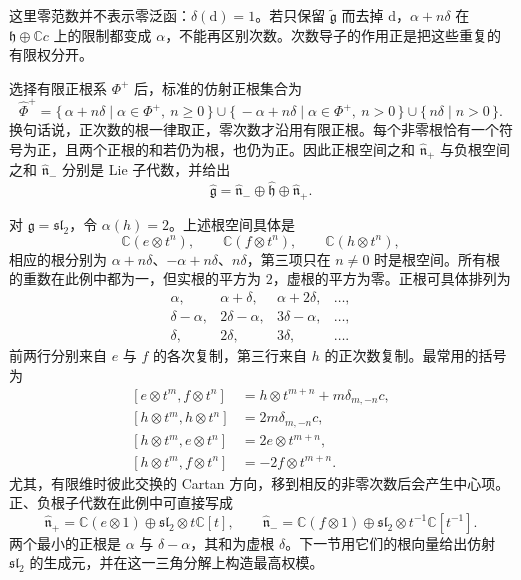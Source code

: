 这里零范数并不表示零泛函：\(\delta(\mathrm d)=1\)。若只保留 \(\widetilde{\mathfrak g}\) 而去掉 \(\mathrm d\)，\(\alpha+n\delta\) 在 \(\mathfrak h\oplus\mathbb Cc\) 上的限制都变成 \(\alpha\)，不能再区别次数。次数导子的作用正是把这些重复的有限权分开。

\ProseParagraphBreak

选择有限正根系 \(\Phi^+\) 后，标准的仿射正根集合为
\begin{equation}\label{b5:eq:G-affine-positive-roots}
	\widehat\Phi^+
	=\{\,\alpha+n\delta\mid\alpha\in\Phi^+,\ n\ge0\,\}
	\cup\{\,-\alpha+n\delta\mid\alpha\in\Phi^+,\ n>0\,\}
	\cup\{\,n\delta\mid n>0\,\}.
\end{equation}
换句话说，正次数的根一律取正，零次数才沿用有限正根。每个非零根恰有一个符号为正，且两个正根的和若仍为根，也仍为正。因此正根空间之和 \(\widehat{\mathfrak n}_+\) 与负根空间之和 \(\widehat{\mathfrak n}_-\) 分别是 Lie 子代数，并给出
\[
	\widehat{\mathfrak g}
	=\widehat{\mathfrak n}_-\oplus\widehat{\mathfrak h}\oplus\widehat{\mathfrak n}_+.
\]

对 \(\mathfrak g=\mathfrak{sl}_2\)，令 \(\alpha(h)=2\)。上述根空间具体是
\[
	\mathbb C(e\otimes t^n),\qquad
	\mathbb C(f\otimes t^n),\qquad
	\mathbb C(h\otimes t^n),
\]
相应的根分别为 \(\alpha+n\delta\)、\(-\alpha+n\delta\)、\(n\delta\)，第三项只在 \(n\ne0\) 时是根空间。所有根的重数在此例中都为一，但实根的平方为 \(2\)，虚根的平方为零。正根可具体排列为
\[
	\begin{array}{llll}
		\alpha,&\alpha+\delta,&\alpha+2\delta,&\ldots,\\
		\delta-\alpha,&2\delta-\alpha,&3\delta-\alpha,&\ldots,\\
		\delta,&2\delta,&3\delta,&\ldots.
	\end{array}
\]
前两行分别来自 \(e\) 与 \(f\) 的各次复制，第三行来自 \(h\) 的正次数复制。最常用的括号为
\begin{equation}\label{b5:eq:G-affine-sl2-brackets}
	\begin{aligned}
		[e\otimes t^m,f\otimes t^n]
		&=h\otimes t^{m+n}+m\delta_{m,-n}c,\\
		[h\otimes t^m,h\otimes t^n]
		&=2m\delta_{m,-n}c,\\
		[h\otimes t^m,e\otimes t^n]&=2e\otimes t^{m+n},\\
		[h\otimes t^m,f\otimes t^n]&=-2f\otimes t^{m+n}.
	\end{aligned}
\end{equation}
尤其，有限维时彼此交换的 Cartan 方向，移到相反的非零次数后会产生中心项。正、负根子代数在此例中可直接写成
\[
	\widehat{\mathfrak n}_+
	=\mathbb C(e\otimes1)\oplus\mathfrak{sl}_2\otimes t\mathbb C[t],
	\qquad
	\widehat{\mathfrak n}_-
	=\mathbb C(f\otimes1)\oplus\mathfrak{sl}_2\otimes t^{-1}\mathbb C[t^{-1}].
\]
两个最小的正根是 \(\alpha\) 与 \(\delta-\alpha\)，其和为虚根 \(\delta\)。下一节用它们的根向量给出仿射 \(\mathfrak{sl}_2\) 的生成元，并在这一三角分解上构造最高权模。
